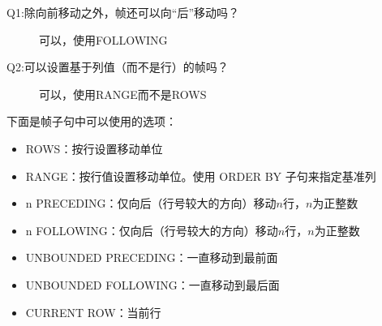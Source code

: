 
\begin{description}
      \item[Q1:除向前移动之外，帧还可以向“后”移动吗？] 可以，使用\textsf{FOLLOWING}
      \item[Q2:可以设置基于列值（而不是行）的帧吗？] 可以，使用\textsf{RANGE}而不是\textsf{ROWS}
\end{description}

下面是帧子句中可以使用的选项：
\begin{itemize}
      \item \textsf{ROWS}：按行设置移动单位
      \item \textsf{RANGE}：按行值设置移动单位。使用 ORDER BY 子句来指定基准列
      \item \textsf{n PRECEDING}：仅向后（行号较大的方向）移动$n$行，$n$为正整数
      \item \textsf{n FOLLOWING}：仅向后（行号较大的方向）移动$n$行，$n$为正整数
      \item \textsf{UNBOUNDED PRECEDING}：一直移动到最前面
      \item \textsf{UNBOUNDED FOLLOWING}：一直移动到最后面
      \item \textsf{CURRENT ROW}：当前行
\end{itemize}